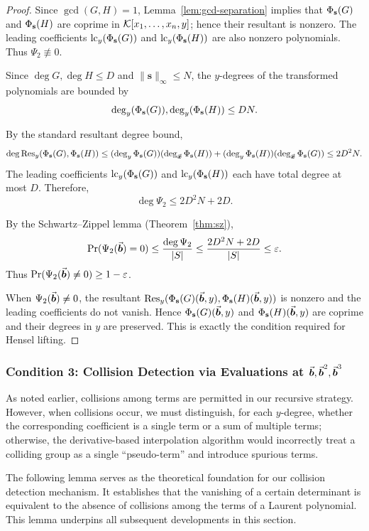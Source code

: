 \documentclass{article}
\numberwithin{equation}{section}
\begin{document}
\begin{proof}
Since $\gcd(G, H) = 1$, Lemma~\ref{lem:gcd-separation} implies that $\Phi_{\mathbf{s}}(G)$ and $\Phi_{\mathbf{s}}(H)$ are coprime in ${\mathcal{K}}[x_1, \dots, x_n, y]$; hence their resultant is nonzero. The leading coefficients $\operatorname{lc}_y(\Phi_{\mathbf{s}}(G))$ and $\operatorname{lc}_y(\Phi_{\mathbf{s}}(H))$ are also nonzero polynomials. Thus $\Psi_2 \not\equiv 0$.

Since $\deg G, \deg H \le D$ and $\|\mathbf{s}\|_\infty \le N$, the $y$-degrees of the transformed polynomials are bounded by
\[
\deg_y(\Phi_{\mathbf{s}}(G)), \deg_y(\Phi_{\mathbf{s}}(H)) \le D N.
\]


By the standard resultant degree bound,
\[
\deg \operatorname{Res}_y(\Phi_{\mathbf{s}}(G), \Phi_{\mathbf{s}}(H))
\le (\deg_y \Phi_{\mathbf{s}}(G))(\deg_{\vec{\boldsymbol{x}}} \Phi_{\mathbf{s}}(H)) + (\deg_y \Phi_{\mathbf{s}}(H))(\deg_{\vec{\boldsymbol{x}}} \Phi_{\mathbf{s}}(G))
\le 2D^2 N.
\]
The leading coefficients $\operatorname{lc}_y(\Phi_{\mathbf{s}}(G))$ and $\operatorname{lc}_y(\Phi_{\mathbf{s}}(H))$ each have total degree at most $D$. Therefore,
\[
\deg \Psi_2 \le 2D^2 N + 2D.
\]

By the Schwartz--Zippel lemma (Theorem~\ref{thm:sz}),
\[
\Pr(\Psi_2(\vec{\boldsymbol{b}}) = 0) \le \frac{\deg \Psi_2}{|S|}
\le \frac{2D^2 N + 2D}{|S|}
\le \varepsilon.
\]
Thus $\Pr(\Psi_2(\vec{\boldsymbol{b}}) \neq 0) \ge 1 - \varepsilon$.

When $\Psi_2(\vec{\boldsymbol{b}}) \neq 0$, the resultant $\operatorname{Res}_y(\Phi_{\mathbf{s}}(G)(\vec{\boldsymbol{b}}, y), \Phi_{\mathbf{s}}(H)(\vec{\boldsymbol{b}}, y))$ is nonzero and the leading coefficients do not vanish. Hence $\Phi_{\mathbf{s}}(G)(\vec{\boldsymbol{b}}, y)$ and $\Phi_{\mathbf{s}}(H)(\vec{\boldsymbol{b}}, y)$ are coprime and their degrees in $y$ are preserved. This is exactly the condition required for Hensel lifting.
\end{proof}


\subsubsection*{Condition 3: Collision Detection via Evaluations at $\vec{\boldsymbol{b}}, \vec{\boldsymbol{b}}^2, \vec{\boldsymbol{b}}^3$}







As noted earlier, collisions among terms are permitted in our recursive strategy. However, when collisions occur, we must distinguish, for each $y$-degree, whether the corresponding coefficient is a single term or a sum of multiple terms; otherwise, the derivative-based interpolation algorithm would incorrectly treat a colliding group as a single ``pseudo-term'' and introduce spurious terms.


The following lemma serves as the theoretical foundation for our collision detection mechanism. It establishes that the vanishing of a certain determinant is equivalent to the absence of collisions among the terms of a Laurent polynomial. This lemma underpins all subsequent developments in this section.
\end{document}
